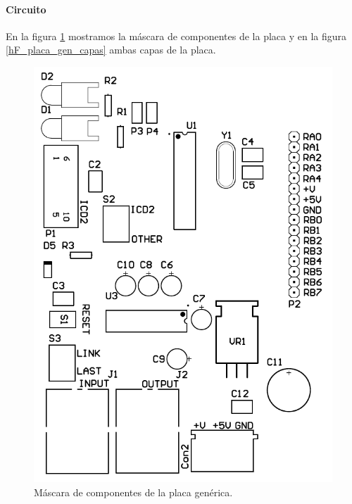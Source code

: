 \paragraph{Circuito}
\label{h_placas_generica_circuito}

En la figura \ref{hF_placa_gen_componentes} mostramos la m\'ascara de componentes de la placa y en
la figura \ref{hF_placa_gen_capas} ambas capas de la placa.

\begin{figure}
	\centering
	\includegraphics[scale=.2]{figuras/gen_componentes.png}
	\caption{M\'ascara de componentes de la placa gen\'erica.}
	\label{hF_placa_gen_componentes}
\end{figure}


